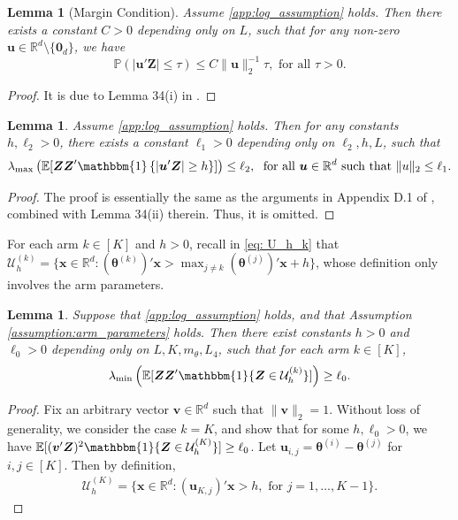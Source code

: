 \documentclass[aos,preprint]{imsart}
\theoremstyle{plain}
\newtheorem{lemma}[theorem]{Lemma}
\theoremstyle{definition}
\newcommand{\btheta}{\boldsymbol{\theta}}
\newcommand{\bd}[1]{\boldsymbol{#1}}
\newcommand{\idf}{\mathbbm{1}}
\newcommand{\lmin}[1]{\lambda_{\min}\left(#1\right)}
\newcommand{\lmax}[1]{\lambda_{\max}\left(#1\right)}
\newcommand{\mR}{\mathbb{R}}
\newcommand{\bu}{\boldsymbol{u}}
\newcommand{\bv}{\boldsymbol{v}}
\newcommand{\bZ}{\boldsymbol{Z}}
\newcommand{\bR}{\mathbb{R}}
\newcommand{\Exp}{\mathbb{E}}
\newcommand{\Pro}{\mathbb{P}}
\begin{document}
\begin{appendix}
\begin{lemma}[Margin Condition] \label{lemma: margin condition} 
Assume \eqref{app:log_assumption} holds. Then there exists a constant $C>0$ depending only on $L$, such that for any non-zero $\bu \in \bR^{d}\setminus \{\bd{0}_d\}$, we have 
$$
\Pro(|\bu'\bZ|\le \tau)\le C \|\bu\|_2^{-1} \tau, \text{ for all } \tau>0.
$$
\end{lemma}
\begin{proof} 
It is due to Lemma 34(i) in \cite{song2022truncated}.
\end{proof}


\begin{lemma}\label{lemma: log_concave_eig_max}
Assume \eqref{app:log_assumption} holds.  Then for any constants $h, \ell_2>0$, there exists a constant $\ell_1>0$ depending only on $\ell_2,h,L$, such that  
$$
\lmax{\Exp[\bZ\bZ'\idf\left\{|\bu'\bZ|\ge h \right\}]} \le \ell_2,\; \text{ for all } \bu \in \mR^d \text{ such that } \|u\|_2\le \ell_1.
$$
\end{lemma}
\begin{proof} 
The proof is essentially the same as the arguments in Appendix D.1 of \cite{song2022truncated}, combined with Lemma 34(ii) therein. Thus, it is omitted.
\end{proof}

For each arm $k\in [K]$ and $h>0$, recall in \eqref{eq: U_h_k} that $\mathcal{U}_h^{(k)} = \{\bd{x}\in \mR^d: (\btheta^{(k)})'\bd{x}> \max_{j\ne k}(\btheta^{(j)})'\bd{x}+h\}$, whose definition only involves the arm parameters.


\begin{lemma}\label{lemma: arm optimality}
Suppose that \eqref{app:log_assumption} holds, and that Assumption \ref{assumption:arm_parameters} holds. Then there exist constants $h>0$ and $\ell_0 > 0$  depending only on $L,K,m_{\theta}, L_4$, such that  for each arm $k \in [K]$,
$$
\lmin{\Exp[\bZ\bZ'\idf\{\bZ\in \mathcal{U}_h^{(k)}\}]}\ge \ell_0.
$$
\end{lemma}
 \begin{proof} 
 Fix an arbitrary vector $\bv \in \bR^{d}$ such that $\|\bv\|_2 = 1$.  Without loss of generality, we consider the case $k = K$, and   show that for some $h,\ell_0 >0$, we have $\Exp[(\bv'\bZ)^2\idf\{\bZ\in \mathcal{U}_h^{(K)}\}] \geq \ell_0$. 
 Let $\bu_{i,j} = \btheta^{(i)}-\btheta^{(j)}$ for $i,j\in[K]$. Then by definition,
 \begin{align*}
    \mathcal{U}_h^{(K)} = \{\bd{x}\in \mR^d: (\bu_{K,j})'\bd{x}>  h, \text{ for } j =1,\ldots,K-1\}. 
 \end{align*}


\end{proof}
\end{appendix}
\end{document}
